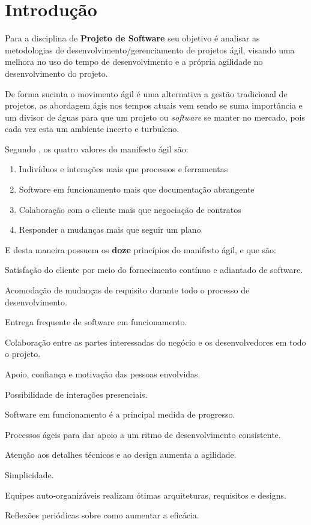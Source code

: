 
\section{Introdução}

\par Para a disciplina de \textbf{Projeto de Software} seu objetivo é analisar as metodologias de desenvolvimento/gerenciamento de projetos ágil, visando uma melhora no uso do tempo de desenvolvimento e a própria agilidade no desenvolvimento do projeto.
\par De forma sucinta o movimento ágil é uma alternativa a gestão tradicional de projetos, as abordagem ágis nos tempos atuais vem sendo se suma importância e um divisor de águas para que um projeto ou \textit{software} se manter no mercado, pois cada vez esta um ambiente incerto e turbuleno.
\par Segundo , os quatro valores do manifesto ágil são:

 \begin{enumerate}[label=\Roman{*}, ref=(\roman{*})]
   \item Indivíduos e interações mais que processos e ferramentas
   \item Software em funcionamento mais que documentação abrangente
   \item Colaboração com o cliente mais que negociação de contratos
   \item Responder a mudanças mais que seguir um plano
 \end{enumerate}
 \par E desta maneira possuem os \textbf{doze} princípios do manifesto ágil, e que são:
\begin{asparaenum}
  \item Satisfação do cliente por meio do fornecimento contínuo e adiantado de software.
  \item Acomodação de mudanças de requisito durante todo o processo de desenvolvimento.
  \item Entrega frequente de software em funcionamento.
  \item Colaboração entre as partes interessadas do negócio e os desenvolvedores em todo o projeto.
  \item Apoio, confiança e motivação das pessoas envolvidas.
  \item Possibilidade de interações presenciais.
  \item Software em funcionamento é a principal medida de progresso.
  \item Processos ágeis para dar apoio a um ritmo de desenvolvimento consistente.
  \item Atenção aos detalhes técnicos e ao design aumenta a agilidade.
  \item Simplicidade.
  \item Equipes auto-organizáveis realizam ótimas arquiteturas, requisitos e designs.
  \item Reflexões periódicas sobre como aumentar a eficácia.

  \cite{smartsheet}
\end{asparaenum}

